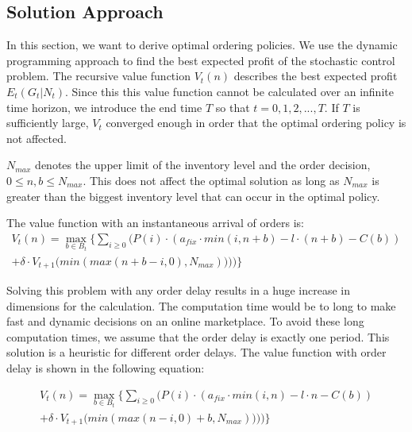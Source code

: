 \subsection{Solution Approach}

In this section, we want to derive optimal ordering policies.
We use the dynamic programming approach to find the best expected profit of the stochastic control problem.
The recursive value function $V_t(n)$ describes the best expected profit $E_t(G_t | N_t)$.
Since this this value function cannot be calculated over an infinite time horizon, we introduce the end time $T$ so that $t = 0, 1, 2, ..., T$.
If $T$ is sufficiently large, $V_t$ converged enough in order that the optimal ordering policy is not affected.

$N_{max}$ denotes the upper limit of the inventory level and the order decision, $0 \leq n, b \leq N_{max}$. This does not affect the optimal solution as long as $N_{max}$ is greater than the biggest inventory level that can occur in the optimal policy.

The value function with an instantaneous arrival of orders is:
\begin{equation}
\begin{split}
V_t(n) = \max_{b \in B_t} \Bigg\{
\sum_{i \geq 0} \Big(
P(i) \cdot (
a_{fix} \cdot min(i, n + b) %
- l \cdot (n + b) %
- C(b) %
) \\
+ \delta \cdot V_{t+1}\big(min(max(n + b - i, 0), N_{max}))\big)
\Big)\Bigg\}
\end{split}
\label{eq:dyn_prog_no_delay}
\end{equation}

Solving this problem with any order delay results in a huge increase in dimensions for the calculation.
The computation time would be to long to make fast and dynamic decisions on an online marketplace.
To avoid these long computation times, we assume that the order delay is exactly one period.
This solution is a heuristic for different order delays.
The value function with order delay is shown in the following equation:

\begin{equation}
\begin{split}
V_t(n) = \max_{b \in B_t} \Bigg\{
	\sum_{i \geq 0} \Big(
		P(i) \cdot (
			a_{fix} \cdot min(i, n) %
			- l \cdot n %
			- C(b) %
		) \\
		+ \delta \cdot V_{t+1}\big(min(max(n - i, 0) + b, N_{max}))\big)
	\Big)\Bigg\}
\end{split}
\label{eq:dyn_prog}
\end{equation}

